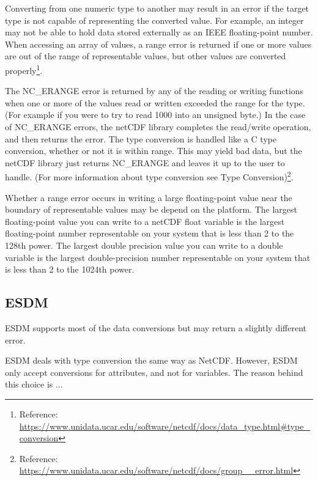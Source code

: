 Converting from one numeric type to another may result in an error if the target type is not capable of representing the converted value. For example, an integer may not be able to hold data stored externally as an IEEE floating-point number. When accessing an array of values, a range error is returned if one or more values are out of the range of representable values, but other values are converted properly\footnote{Reference: \url{https://www.unidata.ucar.edu/software/netcdf/docs/data_type.html\#type_conversion}}.

The NC\_ERANGE error is returned by any of the reading or writing functions when one or more of the values read or written exceeded the range for the type. (For example if you were to try to read 1000 into an unsigned byte.) In the case of NC\_ERANGE errors, the netCDF library completes the read/write operation, and then returns the error. The type conversion is handled like a C type conversion, whether or not it is within range. This may yield bad data, but the netCDF library just returns NC\_ERANGE and leaves it up to the user to handle. (For more information about type conversion see Type Conversion)\footnote{Reference: \url{https://www.unidata.ucar.edu/software/netcdf/docs/group__error.html}}.

\begin{framed}

\tocheck

Whether a range error occurs in writing a large floating-point value near the boundary of representable values may be depend on the platform. The largest floating-point value you can write to a netCDF float variable is the largest floating-point number representable on your system that is less than 2 to the 128th power. The largest double precision value you can write to a double variable is the largest double-precision number representable on your system that is less than 2 to the 1024th power.

\end{framed}

\subsection{ESDM}

\tab
ESDM supports most of the data conversions but may return a slightly different error.

ESDM deals with type conversion the same way as NetCDF. However, ESDM only accept conversions for attributes, and not for variables. The reason behind this choice is ...

